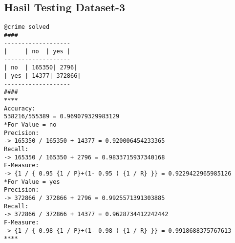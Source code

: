 \subsection{Hasil Testing Dataset-3}
\label{lamp:E-Hasil Testing Dataset-3}
\begin{lstlisting}
@crime solved
####
-------------------
|     | no  | yes |
-------------------
| no  | 165350| 2796|
| yes | 14377| 372866|
-------------------
####	
****
Accuracy:
538216/555389 = 0.969079329983129
*For Value = no
Precision:
-> 165350 / 165350 + 14377 = 0.920006454233365
Recall:
-> 165350 / 165350 + 2796 = 0.9833715937340168
F-Measure:
-> {1 / { 0.95 {1 / P}+(1- 0.95 ) {1 / R} }} = 0.9229422965985126
*For Value = yes
Precision:
-> 372866 / 372866 + 2796 = 0.9925571391303885
Recall:
-> 372866 / 372866 + 14377 = 0.9628734412242442
F-Measure:
-> {1 / { 0.98 {1 / P}+(1- 0.98 ) {1 / R} }} = 0.9918688375767613
****
\end{lstlisting}
